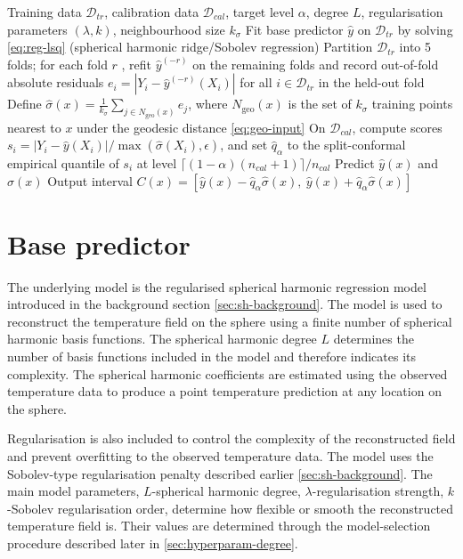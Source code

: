 \documentclass[11pt,a4paper]{report}
\begin{document}
\begin{algorithm}[htbp]
\caption{Adaptive geodesic-neighbourhood conformal prediction for scalar fields on $S^2$}
\label{alg:main}
\begin{algorithmic}[1]
\Require Training data $\mathcal{D}_{tr}$, calibration data $\mathcal{D}_{cal}$, target level $\alpha$, degree $L$, regularisation parameters $(\lambda,k)$, neighbourhood size $k_\sigma$
\State Fit base predictor $\hat y$ on $\mathcal{D}_{tr}$ by solving \cref{eq:reg-lsq} (spherical harmonic ridge/Sobolev regression)
\State Partition $\mathcal{D}_{tr}$ into 5 folds; for each fold $r$ , refit $\hat y^{(-r)}$ on the remaining folds and record out-of-fold absolute residuals $e_i = |Y_i - \hat y^{(-r)}(X_i)|$ for all $i \in \mathcal{D}_{tr}$ in the held-out fold
\State Define $\hat\sigma(x) = \frac{1}{k_\sigma}\sum_{j \in N_{\mathrm{geo}}(x)} e_j$, where $N_{\mathrm{geo}}(x)$ is the set of $k_\sigma$ training points nearest to $x$ under the geodesic distance \cref{eq:geo-input}
\State On $\mathcal{D}_{cal}$, compute scores $s_i = |Y_i - \hat y(X_i)| / \max(\hat\sigma(X_i),\epsilon)$, and set $\hat q_\alpha$ to the split-conformal empirical quantile of $s_i$ at level $\lceil (1-\alpha)(n_{cal}+1)\rceil / n_{cal}$ 
    \State Predict $\hat y(x)$ and $\hat\sigma(x)$
    \State Output interval $C(x) = [\hat y(x) - \hat q_\alpha \hat\sigma(x),\ \hat y(x) + \hat q_\alpha \hat\sigma(x)]$
\EndFor
\end{algorithmic}
\end{algorithm}

\section{Base predictor}

The underlying model is the regularised spherical harmonic regression model introduced in the background section \cref{sec:sh-background}. The model is used to reconstruct the temperature field on the sphere using a finite number of spherical harmonic basis functions. The spherical harmonic degree $L$ determines the number of basis functions included in the model and therefore indicates its complexity. The spherical harmonic coefficients are estimated using the observed temperature data to produce a point temperature prediction at any location on the sphere.
 
Regularisation is also included to control the complexity of the reconstructed field and prevent overfitting to the observed temperature data. The model uses the Sobolev-type regularisation penalty described earlier \cref{sec:sh-background}. The main model parameters, $L$-spherical harmonic degree, $\lambda$-regularisation strength, $k$-Sobolev regularisation order, determine how flexible or smooth the reconstructed temperature field is. Their values are determined through the model-selection procedure described later in \cref{sec:hyperparam-degree}.
\end{document}
